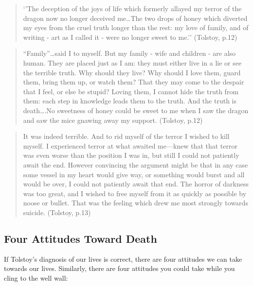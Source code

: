 \documentclass[10pt]{article}
\begin{document}
\begin{quote}
`'The deception of the joys of life which formerly allayed my terror of
the dragon now no longer deceived me\ldots{}The two drops of honey which
diverted my eyes from the cruel truth longer than the rest: my love of
family, and of writing - art as I called it - were no longer sweet to
me.'' (Tolstoy, p.12)
\end{quote}

\begin{quote}
``Family''\ldots{}said I to myself. But my family - wife and children -
are also human. They are placed just as I am: they must either live in a
lie or see the terrible truth. Why should they live? Why should I love
them, guard them, bring them up, or watch them? That they may come to
the despair that I feel, or else be stupid? Loving them, I cannot hide
the truth from them: each step in knowledge leads them to the truth. And
the truth is death\ldots{}.No sweetness of honey could be sweet to me
when I saw the dragon and saw the mice gnawing away my support.
(Tolstoy, p.12)
\end{quote}

\begin{quote}
It was indeed terrible. And to rid myself of the terror I wished to kill
myself. I experienced terror at what awaited me---knew that that terror
was even worse than the position I was in, but still I could not
patiently await the end. However convincing the argument might be that
in any case some vessel in my heart would give way, or something would
burst and all would be over, I could not patiently await that end. The
horror of darkness was too great, and I wished to free myself from it as
quickly as possible by noose or bullet. That was the feeling which drew
me most strongly towards suicide. (Tolstoy, p.13)
\end{quote}

\subsection{Four Attitudes Toward
Death}\label{four-attitudes-toward-death}

If Tolstoy's diagnosis of our lives is correct, there are four attitudes
we can take towards our lives. Similarly, there are four attitudes you
could take while you cling to the well wall:
\end{document}
